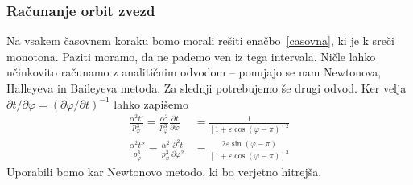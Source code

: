 \documentclass[12pt, a4paper]{article}
\newcommand{\der}[3][]{
    \ensuremath{ \frac{\partial^{#1} #2}{\partial #3^{#1}} }
}
\begin{document}
\subsubsection{Ra\v cunanje orbit zvezd}
Na vsakem \v casovnem koraku bomo morali re\v siti ena\v cbo~\eqref{casovna}, ki je k sre\v ci monotona. Paziti moramo,
da ne pademo ven iz tega intervala. Ni\v cle lahko u\v cinkovito ra\v cunamo z analiti\v cnim odvodom -- ponujajo se
nam Newtonova, Halleyeva in Baileyeva metoda. Za slednji potrebujemo \v se drugi odvod. Ker velja $\partial t/\partial
\varphi = (\partial \varphi/\partial t)^{-1}$ lahko zapi\v semo
\begin{align}
    \frac{\alpha^2 t'}{p_\varphi^3} = \frac{\alpha^2}{p_\varphi^3} \der{t}{\varphi} &= \frac{1}{[1 +
        \varepsilon\cos(\varphi - \pi)]^2} \\
    \frac{\alpha^2 t''}{p_\varphi^3} = \frac{\alpha^2}{p_\varphi^3} \der[2]{t}{\varphi} &=
        \frac{2\varepsilon\sin(\varphi - \pi)}{[1 + \varepsilon\cos(\varphi - \pi)]^3}
\end{align}
Uporabili bomo kar Newtonovo metodo, ki bo verjetno hitrej\v sa. 
\end{document}

